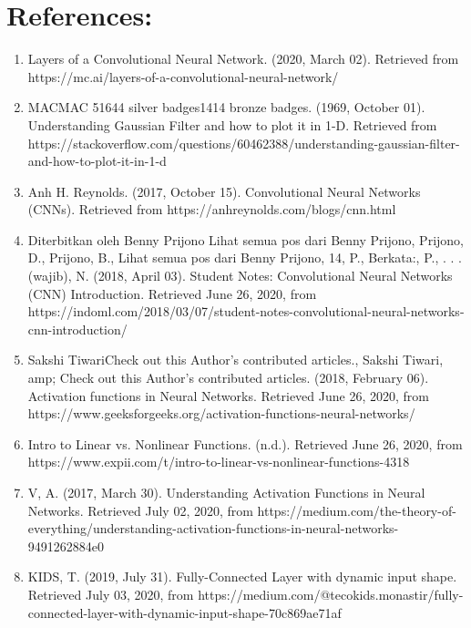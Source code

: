\documentclass{IEEEtran}
\begin{document}
\section{\textbf{References:}}
\begin{enumerate}
\item Layers of a Convolutional Neural Network. (2020, March 02). Retrieved from https://mc.ai/layers-of-a-convolutional-neural-network/

\item MACMAC 51644 silver badges1414 bronze badges. (1969, October 01). Understanding Gaussian Filter and how to plot it in 1-D. Retrieved from https://stackoverflow.com/questions/60462388/understanding-gaussian-filter-and-how-to-plot-it-in-1-d

\item Anh H. Reynolds. (2017, October 15). Convolutional Neural Networks (CNNs). Retrieved from https://anhreynolds.com/blogs/cnn.html

\item Diterbitkan oleh Benny Prijono Lihat semua pos dari Benny Prijono, Prijono, D., Prijono, B., Lihat semua pos dari Benny Prijono, 14, P., Berkata:, P., . . . (wajib), N. (2018, April 03). Student Notes: Convolutional Neural Networks (CNN) Introduction. Retrieved June 26, 2020, from https://indoml.com/2018/03/07/student-notes-convolutional-neural-networks-cnn-introduction/

\item Sakshi TiwariCheck out this Author's contributed articles., Sakshi Tiwari, amp; Check out this Author's contributed articles. (2018, February 06). Activation functions in Neural Networks. Retrieved June 26, 2020, from https://www.geeksforgeeks.org/activation-functions-neural-networks/

\item Intro to Linear vs. Nonlinear Functions. (n.d.). Retrieved June 26, 2020, from https://www.expii.com/t/intro-to-linear-vs-nonlinear-functions-4318

\item V, A. (2017, March 30). Understanding Activation Functions in Neural Networks. Retrieved July 02, 2020, from https://medium.com/the-theory-of-everything/understanding-activation-functions-in-neural-networks-9491262884e0

\item KIDS, T. (2019, July 31). Fully-Connected Layer with dynamic input shape. Retrieved July 03, 2020, from https://medium.com/@tecokids.monastir/fully-connected-layer-with-dynamic-input-shape-70c869ae71af


\end{enumerate}
\end{document}
